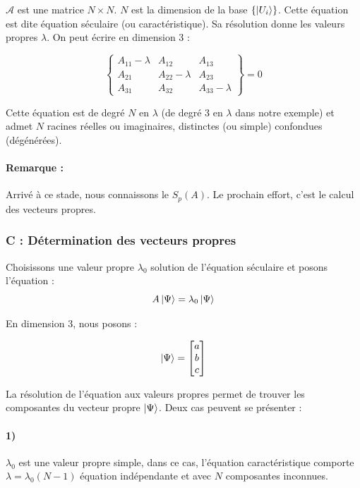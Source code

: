 \documentclass[12pt,a4paper,titlepage]{book}
\begin{document}
$\mathcal{A}$ est une matrice $N \times N$. $N$ est la dimension de la base $\left\lbrace \ket{U_i} \right\rbrace$. Cette équation est dite équation séculaire (ou caractéristique). Sa résolution donne les valeurs propres $\lambda$. On peut écrire en dimension 3 :\\
\begin{center}
\[
\left\lbrace
\begin{matrix}
A_{11} - \lambda & A_{12} & A_{13}\\
A_{21} & A_{22} - \lambda & A_{23}\\
A_{31} & A_{32} & A_{33} - \lambda
\end{matrix}
\right\rbrace = 0
\]
\end{center}
Cette équation est de degré $N$ en $\lambda$ (de degré 3 en $\lambda$ dans notre exemple) et admet $N$ racines réelles ou imaginaires, distinctes (ou simple) confondues (dégénérées).

\paragraph*{Remarque :}
Arrivé à ce stade, nous connaissons le $S_p (A)$. Le prochain effort, c'est le calcul des vecteurs propres.

\subsubsection{C : Détermination des vecteurs propres}

Choisissons une valeur propre $\lambda_0$ solution de l'équation séculaire et posons l'équation :
\begin{equation*}
A \ket{\Psi} = \lambda_0 \ket{\Psi}
\end{equation*}

En dimension 3, nous posons :
\begin{center}
\[
\ket{\Psi} =
\left[
\begin{matrix}
a\\
b\\
c
\end{matrix}
\right]
\]
\end{center}

La résolution de l'équation aux valeurs propres permet de trouver les composantes du vecteur propre $\ket{\Psi}$. Deux cas peuvent se présenter :
\paragraph*{1)}
$\lambda_0$ est une valeur propre simple, dans ce cas, l'équation caractéristique comporte $\lambda = \lambda_0 (N-1)$ équation indépendante et avec $N$ composantes inconnues.
\end{document}
